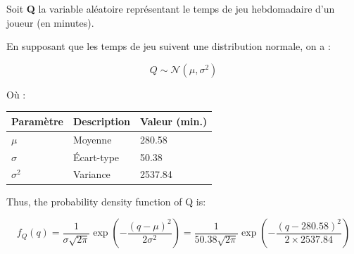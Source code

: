 Soit \textbf{Q} la variable aléatoire représentant le temps de jeu
hebdomadaire d'un joueur (en minutes).

En supposant que les temps de jeu suivent une distribution normale, on a
:

\[Q \sim \mathcal{N}(\mu, \sigma^2)\]

Où :

\begin{longtable}[]{@{}lll@{}}
\toprule\noalign{}
Paramètre & Description & Valeur (min.) \\
\midrule\noalign{}
\endhead
\bottomrule\noalign{}
\endlastfoot
\(\mu\) & Moyenne & 280.58 \\
\(\sigma\) & Écart-type & 50.38 \\
\(\sigma^2\) & Variance & 2537.84 \\
\end{longtable}

Thus, the probability density function of Q is:

\[f_Q(q) = \frac{1}{\sigma\sqrt{2\pi}} \exp\left(-\frac{(q-\mu)^2}{2\sigma^2}\right) = \frac{1}{50.38\sqrt{2\pi}} \exp\left(-\frac{(q-280.58)^2}{2 \times 2537.84}\right)\]
